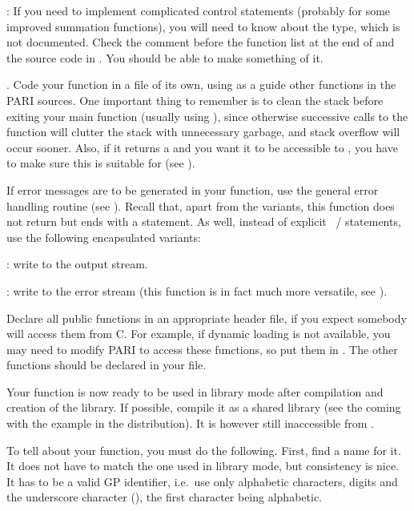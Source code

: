: If you need to implement complicated control statements
(probably for some improved summation functions), you will need to know about
the  type, which is not documented. Check the comment before
the function list at the end of  and the source code
in . You should be able to make something of it.
\smallskip

.
\noindent
Code your function in a file of its own, using as a guide other functions
in the PARI sources. One important thing to remember is to clean the stack
before exiting your main function (usually using ), since
otherwise successive calls to the function will clutter the stack with
unnecessary garbage, and stack overflow will occur sooner. Also, if it
returns a  and you want it to be accessible to , you have to
make sure this  is suitable for  (see
).

If error messages are to be generated in your function, use the general
error handling routine  (see ). Recall that, apart
from the  variants, this function does not return but ends with
a  statement. As well, instead of explicit ~/
 statements, use the following encapsulated variants:

: write  to the  output stream.

: write  to the  error stream (this
function is in fact much more versatile, see ).

Declare all public functions in an appropriate header file, if you
expect somebody will access them from C.  For example, if dynamic
loading is not available, you may need to modify PARI to access these
functions, so put them in . The other functions should
be declared  in your file.

Your function is now ready to be used in library mode after compilation and
creation of the library. If possible, compile it as a shared library (see
the  coming with the  example in the
distribution). It is however still inaccessible from .\smallskip


To tell  about your function, you must do the following. First, find a
name for it. It does not have to match the one used in library mode, but
consistency is nice. It has to be a valid GP identifier, i.e.~use only
alphabetic characters, digits and the underscore character (\kbd{\_}), the
first character being alphabetic.


